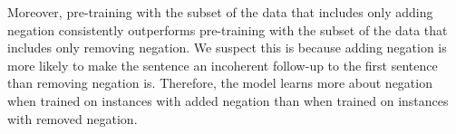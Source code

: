 Moreover, pre-training with the subset of the data that includes only adding negation consistently outperforms pre-training with the subset of the data that includes only removing negation.
We suspect this is because adding negation is more likely to make the sentence an incoherent follow-up to the first sentence than removing negation is.
Therefore, the model learns more about negation when trained on instances with added negation than when trained on instances with removed negation.